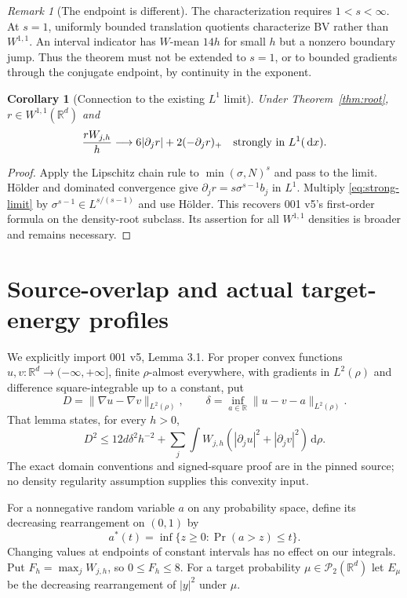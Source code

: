 \documentclass[11pt]{article}
\newtheorem{corollary}[theorem]{Corollary}
\theoremstyle{remark}\newtheorem{remark}[theorem]{Remark}
\newcommand{\R}{\mathbb R}
\newcommand{\dd}{\,\mathrm d}
\newcommand{\norm}[1]{\lVert#1\rVert}
\newcommand{\Ptwo}{\mathcal P_2}
\begin{document}
\begin{remark}[The endpoint is different]
The characterization requires $1<s<\infty$. At $s=1$, uniformly bounded translation quotients characterize BV rather than $W^{1,1}$. An interval indicator has $W$-mean $14h$ for small $h$ but a nonzero boundary jump. Thus the theorem must not be extended to $s=1$, or to bounded gradients through the conjugate endpoint, by continuity in the exponent.
\end{remark}

\begin{corollary}[Connection to the existing $L^1$ limit]
Under Theorem~\ref{thm:root}, $r\in W^{1,1}(\R^d)$ and
\[
 \frac{rW_{j,h}}h\longrightarrow
 6|\partial_jr|+2(-\partial_jr)_+\quad\hbox{strongly in }L^1(\dd x).
\]
\end{corollary}
\begin{proof}
Apply the Lipschitz chain rule to $\min(\sigma,N)^s$ and pass to the limit. H\"older and dominated convergence give
$\partial_jr=s\sigma^{s-1}b_j$ in $L^1$. Multiply \eqref{eq:strong-limit} by $\sigma^{s-1}\in L^{s/(s-1)}$ and use H\"older. This recovers 001 v5's first-order formula on the density-root subclass. Its assertion for all $W^{1,1}$ densities is broader and remains necessary.
\end{proof}

\section{Source-overlap and actual target-energy profiles}
We explicitly import 001 v5, Lemma 3.1. For proper convex functions $u,v:\R^d\to(-\infty,+\infty]$, finite $\rho$-almost everywhere, with gradients in $L^2(\rho)$ and difference square-integrable up to a constant, put
\[
 D=\norm{\nabla u-\nabla v}_{L^2(\rho)},\qquad
 \delta=\inf_{a\in\R}\norm{u-v-a}_{L^2(\rho)}.
\]
That lemma states, for every $h>0$,
\begin{equation}\label{eq:imported}
 D^2\le12d\delta^2h^{-2}+\sum_j\int W_{j,h}
                 (|\partial_ju|^2+|\partial_jv|^2)\dd\rho.
\end{equation}
The exact domain conventions and signed-square proof are in the pinned source; no density regularity assumption supplies this convexity input.

For a nonnegative random variable $a$ on any probability space, define its decreasing rearrangement on $(0,1)$ by
\[
 a^*(t)=\inf\{z\ge0:\Pr(a>z)\le t\}.
\]
Changing values at endpoints of constant intervals has no effect on our integrals. Put $F_h=\max_jW_{j,h}$, so $0\le F_h\le8$. For a target probability $\mu\in\Ptwo(\R^d)$ let $E_\mu$ be the decreasing rearrangement of $|y|^2$ under $\mu$.
\end{document}
